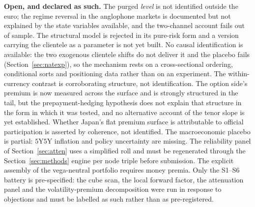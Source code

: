 \documentclass[11pt]{article}
\begin{document}
\textbf{Open, and declared as such.} The purged \emph{level} is not identified outside the euro; the
regime reversal in the anglophone markets is documented but not explained by the state variables
available, and the two-channel account fails out of sample. The structural model is rejected in its
pure-risk form and a version carrying the clientele as a parameter is not yet built. No causal identification is
available: the two exogenous clientele shifts do not deliver it and the placebo fails
(Section~\ref{sec:natexp}), so the mechanism rests on a cross-sectional ordering, conditional sorts and
positioning data rather than on an experiment. The within-currency contrast is corroborating structure,
not identification. The option side's premium is now measured across the surface and is strongly structured in the tail, but the prepayment-hedging hypothesis does not explain that structure in the form in which it was tested, and no alternative account of the tenor slope is yet established. Whether Japan's flat premium surface is attributable to official participation is asserted by coherence, not identified. The
macroeconomic placebo is partial: $5$Y$5$Y inflation and policy uncertainty are missing. The
reliability panel of Section~\ref{sec:atten} uses a simplified roll and must be regenerated through
the Section~\ref{sec:methods} engine per node triple before submission. The explicit assembly of the
vega-neutral portfolio requires money premia. Only the S1--S6 battery is pre-specified: the cube
scan, the local forward factor, the attenuation panel and the volatility-premium decomposition were
run in response to objections and must be labelled as such rather than as pre-registered.
\end{document}
